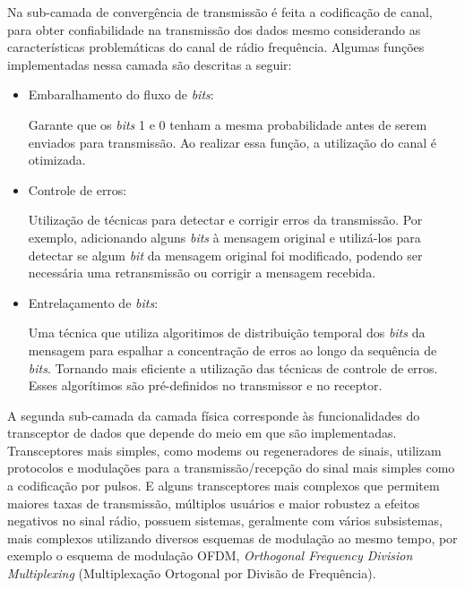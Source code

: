 Na sub-camada de convergência de transmissão é feita a codificação de canal, para obter confiabilidade na transmissão dos dados mesmo considerando as características problemáticas do canal de rádio frequência. Algumas funções implementadas nessa camada são descritas a seguir:
\begin{itemize}
	\item Embaralhamento do fluxo de \emph{bits}:

	      Garante que os \emph{bits} 1 e 0 tenham a mesma probabilidade antes de serem enviados para transmissão. Ao realizar essa função, a utilização do canal é otimizada.
	\item Controle de erros:

	      Utilização de técnicas para detectar e corrigir erros da transmissão. Por exemplo, adicionando alguns \emph{bits} à mensagem original e utilizá-los para detectar se algum \emph{bit} da mensagem original foi modificado, podendo ser necessária uma retransmissão ou corrigir a mensagem recebida.
	\item Entrelaçamento de \emph{bits}:

	      Uma técnica que utiliza algoritimos de distribuição temporal dos \emph{bits} da mensagem para espalhar a concentração de erros ao longo da sequência de \emph{bits}. Tornando mais eficiente a utilização das técnicas de controle de erros. Esses algorítimos são pré-definidos no transmissor e no receptor.
\end{itemize}

A segunda sub-camada da camada física corresponde às funcionalidades do transceptor de dados que depende do meio em que são implementadas. Transceptores mais simples, como modems ou regeneradores de sinais, utilizam protocolos e modulações para a transmissão/recepção do sinal mais simples como a codificação por pulsos. E alguns transceptores mais complexos que permitem maiores taxas de transmissão, múltiplos usuários e maior robustez a efeitos negativos no sinal rádio, possuem sistemas, geralmente com vários subsistemas, mais complexos utilizando diversos esquemas de modulação ao mesmo tempo, por exemplo o esquema de modulação OFDM, \emph{Orthogonal Frequency Division Multiplexing} (Multiplexação Ortogonal por Divisão de Frequência).


